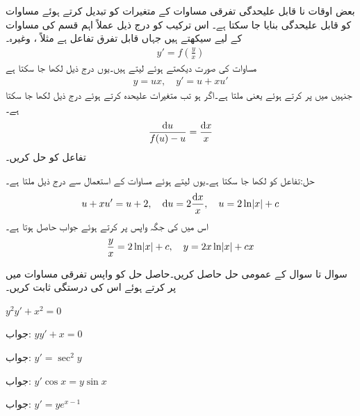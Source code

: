 بعض اوقات نا قابل علیحدگی تفرقی مساوات کے متغیرات کو تبدیل کرتے ہوئے مساوات کو قابل علیحدگی بنایا جا سکتا ہے۔ اس ترکیب کو درج ذیل عملاً اہم قسم کی مساوات کے لیے سیکھتے ہیں جہاں  قابل تفرق تفاعل ہے مثلاً ،  وغیرہ۔
\begin{align}
y'=f\left(\frac{y}{x}\right)
\end{align}  
مساوات کی صورت دیکھتے ہوئے  لیتے ہیں۔یوں درج ذیل لکھا جا سکتا ہے
\begin{align}\label{مساوات_سادہ_اول_جامع_علیحدگی_الف}
y=ux,\quad y'=u+xu'
\end{align}
جنہیں  میں پر کرتے ہوئے  یعنی  ملتا ہے۔اگر  ہو تب متغیرات علیحدہ کرتے ہوئے درج ذیل لکھا جا سکتا ہے۔
\begin{align} 
\frac{\dif u}{f(u)-u}=\frac{\dif x}{x}
\end{align}
تفاعل  کو حل کریں۔

حل:تفاعل کو  لکھا جا سکتا ہے۔یوں  لیتے ہوئے  مساوات  کے استعمال سے درج ذیل ملتا ہے۔
\begin{align*}
u+xu'=u+2, \quad \dif u=2\frac{\dif x}{x},\quad u=2\ln \abs{x}+c
\end{align*}
اس میں  کی جگہ واپس  پر کرتے ہوئے جواب حاصل ہوتا ہے۔
\begin{align*}
\frac{y}{x}=2\ln \abs{x}+c,\quad y=2x\ln \abs{x}+cx
\end{align*}

سوال  تا سوال  کے عمومی حل حاصل کریں۔حاصل حل کو واپس تفرقی مساوات میں پر کرتے ہوئے اس کی درستگی ثابت کریں۔

$y^2y'+x^2=0$

جواب:
$yy'+x=0$

جواب:
$y'=\sec^2 y$

جواب:
$y'\cos x=y\sin x$

جواب:
$y'=ye^{x-1}$

